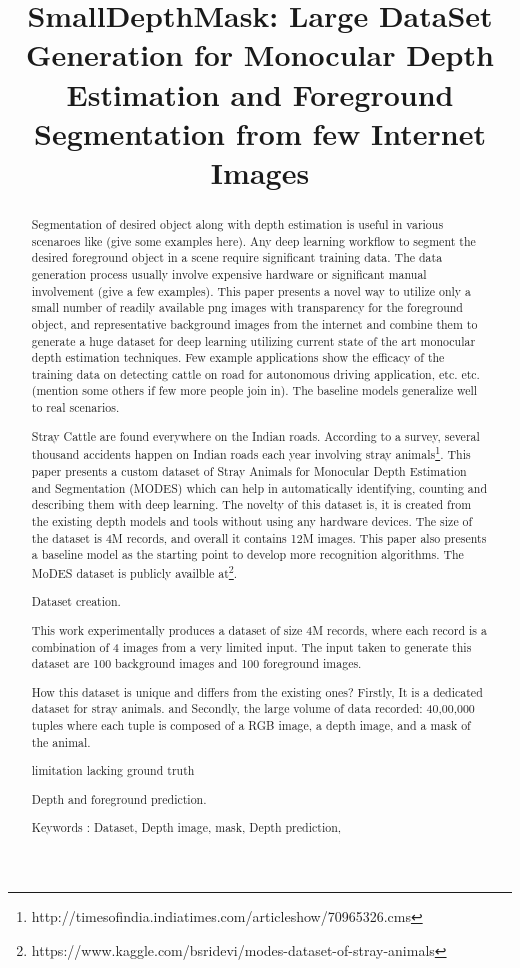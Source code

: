 \documentclass{article}
\title{SmallDepthMask: Large DataSet Generation for Monocular Depth Estimation and Foreground Segmentation from few Internet Images}
\begin{document}
\maketitle

\begin{abstract}
Segmentation of desired object along with depth estimation is useful in various scenaroes like (give some examples here). 
Any deep learning workflow to segment the desired foreground object in a scene require significant training data.
The data generation process usually involve expensive hardware or significant manual involvement (give a few examples). 
This paper presents a novel way to utilize only a small number of readily available png images with transparency for the foreground object, and representative
background images from the internet and combine them to generate a huge dataset for deep learning
utilizing current state of the art monocular depth estimation techniques. Few example applications show the efficacy of the training data on detecting 
cattle on road for autonomous driving application, etc. etc. (mention some others if few more people join in). The baseline models generalize 
well to real scenarios.

Stray Cattle are found everywhere on the Indian roads.
According to a survey, several thousand accidents happen on Indian roads each year 
involving stray animals\footnote{http://timesofindia.indiatimes.com/articleshow/70965326.cms}. 
This paper presents a custom dataset of Stray Animals for Monocular Depth Estimation and Segmentation (MODES) 
which can help in automatically identifying, counting and describing them with deep learning. 
The novelty of this dataset is, it is created from the existing depth models and tools without using any hardware devices. 
The size of the dataset is 4M records, and overall it contains 12M images. 
This paper also presents a baseline model as the starting point to develop more recognition algorithms.
The MoDES dataset is publicly availble at\footnote{https://www.kaggle.com/bsridevi/modes-dataset-of-stray-animals}.



Dataset creation. 

This work experimentally produces a dataset of size 4M records, where each record is a combination of 4 images from a very limited input. The input taken to generate this dataset are 100 background images and 100 foreground images.

How this dataset is unique and differs from the existing ones?  Firstly, It is a dedicated dataset for stray animals. and Secondly, the large
volume of data recorded: 40,00,000 tuples where each tuple is composed of a RGB image, a depth image, and a mask of the animal. 

limitation lacking ground truth

Depth and foreground prediction.


Keywords : Dataset, Depth image, mask, Depth prediction,
\end{abstract}
\end{document}
